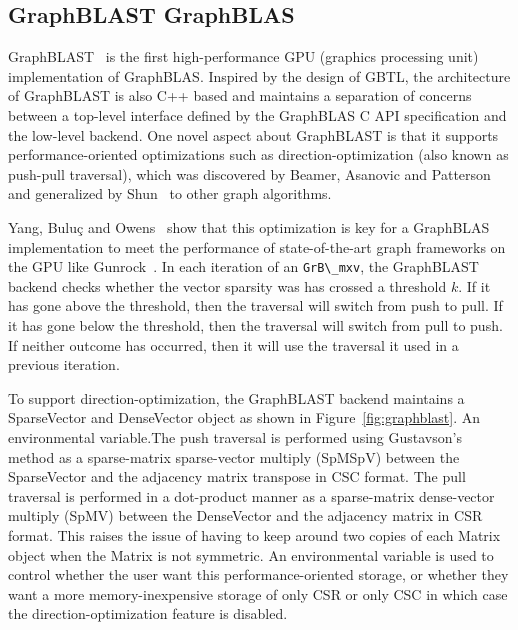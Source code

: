 \subsection{GraphBLAST GraphBLAS}


GraphBLAST~\cite{Yang:2019:GBL} is the first high-performance GPU (graphics processing unit) implementation of GraphBLAS. Inspired by the design of GBTL, the architecture of GraphBLAST is also C++ based and maintains a separation of concerns between a top-level interface defined by the GraphBLAS C API specification and the low-level backend. One novel aspect about GraphBLAST is that it supports performance-oriented optimizations such as  direction-optimization (also known as push-pull traversal), which was discovered by Beamer, Asanovic and Patterson~\cite{Beamer:2012:DOB} and generalized by Shun~\cite{Shun:2013:Ligra} to other graph algorithms.

Yang, Bulu\c{c} and Owens~\cite{Yang:2018:IPE} show that this optimization is key for a GraphBLAS implementation to meet the performance of state-of-the-art graph frameworks on the GPU like Gunrock~\cite{Wang:2017:GGG}. In each iteration of an \verb'GrB\_mxv', the GraphBLAST backend checks whether the vector sparsity was has crossed a threshold $k$. If it has gone above the threshold, then the traversal will switch from push to pull. If it has gone below the threshold, then the traversal will switch from pull to push. If neither outcome has occurred, then it will use the traversal it used in a previous iteration. 

To support direction-optimization, the GraphBLAST backend maintains a SparseVector and DenseVector object as shown in Figure~\ref{fig:graphblast}. An environmental variable.The push traversal is performed using Gustavson's method as a sparse-matrix sparse-vector multiply (SpMSpV) between the SparseVector and the adjacency matrix transpose in CSC format. The pull traversal is performed in a dot-product manner as a sparse-matrix dense-vector multiply (SpMV) between the DenseVector and the adjacency matrix in CSR format. This raises the issue of having to keep around two copies of each Matrix object when the Matrix is not symmetric. An environmental variable is used to control whether the user want this performance-oriented storage, or whether they want a more memory-inexpensive storage of only CSR or only CSC in which case the direction-optimization feature is disabled.

